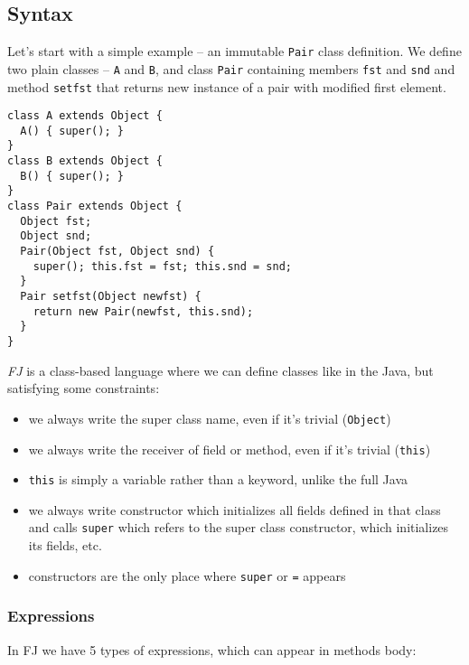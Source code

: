 \documentclass{article}[12pt]
\begin{document}
\subsection{Syntax}

Let's start with a simple example -- an immutable \texttt{Pair} class
definition. We define two plain classes -- \texttt{A} and \texttt{B},
and class \texttt{Pair} containing members \texttt{fst} and \texttt{snd}
and method \texttt{setfst} that returns new instance of a
pair with modified first element.

\begin{verbatim}
class A extends Object {
  A() { super(); }
}
class B extends Object {
  B() { super(); }
}
class Pair extends Object {
  Object fst;
  Object snd;
  Pair(Object fst, Object snd) {
    super(); this.fst = fst; this.snd = snd;
  }
  Pair setfst(Object newfst) {
    return new Pair(newfst, this.snd);
  }
}
\end{verbatim}
\emph{FJ} is a class-based language where we can define classes like in
the Java, but satisfying some constraints:

\begin{itemize}
\item we always write the super class name, even if it's trivial
  (\texttt{Object})
\item we always write the receiver of field or method, even if it's
  trivial (\texttt{this})
\item \texttt{this} is simply a variable rather than a keyword, unlike
  the full Java
\item we always write constructor which initializes all fields
  defined in that class and calls \texttt{super} which refers to the
  super class constructor, which initializes its fields, etc.
\item constructors are the only place where \texttt{super} or
  \texttt{=} appears
\end{itemize}

\subsubsection{Expressions}

In FJ we have 5 types of expressions, which can appear in methods body:
\end{document}
